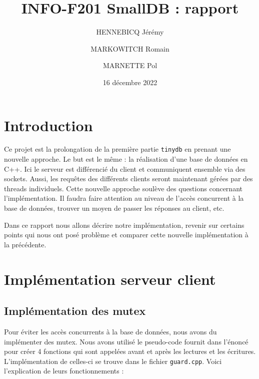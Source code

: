 \documentclass[utf8]{article}
\title{INFO-F201 SmallDB : rapport}
\author{HENNEBICQ Jérémy\and MARKOWITCH Romain \and MARNETTE Pol}
\date{16 décembre 2022}
\begin{document}
\maketitle
\tableofcontents

\newpage


\section{Introduction}

Ce projet est la prolongation de la première partie \texttt{tinydb} en prenant une nouvelle approche. Le but est le même : la réalisation d'une base de données en C++. Ici le serveur est différencié du client et communiquent ensemble via des sockets. Aussi, les requêtes des différents clients seront maintenant gérées par des threads individuels. Cette nouvelle approche soulève des questions concernant l'implémentation. Il faudra faire attention au niveau de l'accès concurrent à la base de données, trouver un moyen de passer les réponses au client, etc.

Dans ce rapport nous allons décrire notre implémentation, revenir sur certains points qui nous ont posé problème et comparer cette nouvelle implémentation à la précédente.

\section{Implémentation serveur client}

\subsection{Implémentation des mutex}


Pour éviter les accès concurrents à la base de données, nous avons du implémenter des mutex. Nous avons utilisé le pseudo-code fournit dans l'énoncé pour créer 4 fonctions qui sont appelées avant et après les lectures et les écritures. L'implémentation de celles-ci se trouve dans le fichier \texttt{guard.cpp}. Voici l'explication de leurs fonctionnements :
\end{document}
